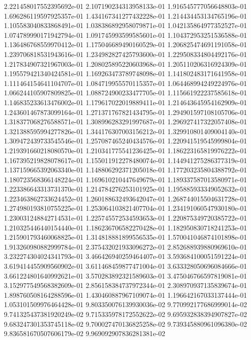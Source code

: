 2.221458017552395692e-01
2.107190234313958133e-01
1.916545777056648803e-01
1.696286119597925357e-01
1.434167341277432228e-01
1.214434453134765196e-01
1.105583040833868491e-01
1.038386892958079871e-01
1.042135864977352527e-01
1.074789990171942794e-01
1.091745993599585601e-01
1.104372953251536588e-01
1.136486768559970412e-01
1.175046689490160529e-01
1.206825474691191058e-01
1.239706818531943616e-01
1.234982827425793600e-01
1.229508334804492176e-01
1.217834907321967003e-01
1.208025895220603968e-01
1.205110206316924309e-01
1.195579421340424581e-01
1.169263473789748098e-01
1.141802483171641958e-01
1.111464154641104707e-01
1.084719955570115357e-01
1.064468994249224976e-01
1.066244105907809825e-01
1.088724900233477705e-01
1.115661922237585618e-01
1.146835233613476002e-01
1.179617022019889411e-01
1.214643645954162909e-01
1.243601467873099164e-01
1.271371767821434795e-01
1.294901597108105706e-01
1.318377068276588571e-01
1.308996283291997687e-01
1.296927417322057408e-01
1.321388595994277826e-01
1.344176307003156212e-01
1.329910801409004140e-01
1.309472439733545546e-01
1.257087465240434576e-01
1.220941519545999804e-01
1.219391660218080570e-01
1.210341775541236425e-01
1.186223165819976222e-01
1.167395219828078617e-01
1.155011912278480074e-01
1.144941275286377319e-01
1.137159665392063340e-01
1.148806292371205018e-01
1.177203235804388792e-01
1.180723568366148224e-01
1.169610210447649679e-01
1.189337587013580971e-01
1.223386643313731370e-01
1.214784276253101925e-01
1.195885933349052632e-01
1.223463862733624452e-01
1.260188632493642047e-01
1.268744015504631728e-01
1.274980193810755225e-01
1.253064103821407704e-01
1.234191060547930180e-01
1.230031248842714531e-01
1.225745572534593653e-01
1.220875349720385722e-01
1.210325446440154440e-01
1.186236706582270428e-01
1.182950830718241253e-01
1.215901793460068825e-01
1.314818881899556535e-01
1.570041046874101898e-01
1.913260980882999784e-01
2.375432021933096272e-01
2.852688939880969610e-01
3.232274304024341793e-01
3.466426940259464407e-01
3.593684100051591224e-01
3.619414455909560902e-01
3.611468459877471004e-01
3.633328050696084666e-01
3.661224801640992621e-01
3.570283892321589603e-01
3.475046766597819081e-01
3.152977549568382609e-01
2.856158384737972344e-01
2.308970937135839674e-01
1.898760508164288596e-01
1.430460887967109074e-01
1.196642167033137444e-01
1.053101509976464428e-01
9.803350076139930036e-02
9.770992177686999014e-02
9.741325437381920249e-02
9.715335978172552622e-02
9.695932838394907827e-02
9.683247301353745118e-02
9.700027470136825258e-02
9.739345880961096380e-02
9.836581670507606179e-02
9.969092907836281381e-02
